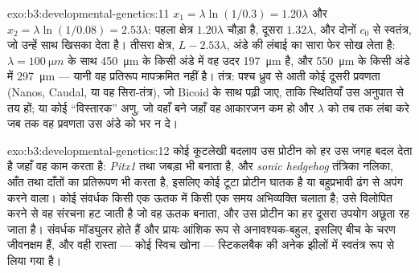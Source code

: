\begin{solution}{exo:b3:developmental-genetics:11}
$x_{1} = \lambda\ln(1/0.3) = 1.20\lambda$ और $x_{2} = \lambda\ln(1/0.08)
= 2.53\lambda$: पहला क्षेत्र $1.20\lambda$ चौड़ा है, दूसरा
$1.32\lambda$, और दोनों $c_{0}$ से स्वतंत्र, जो उन्हें साथ खिसका देता
है। तीसरा क्षेत्र, $L - 2.53\lambda$, अंडे की लंबाई का सारा फेर सोख
लेता है: $\lambda = \qty{100}{\micro m}$ के साथ \qty{450}{\micro m} के
किसी अंडे में वह उदर \qty{197}{\micro m} है, और \qty{550}{\micro m} के
किसी अंडे में \qty{297}{\micro m} --- यानी वह प्रतिरूप मापक्रमित नहीं
है। तंत्र: पश्च ध्रुव से आती कोई दूसरी प्रवणता (Nanos, Caudal, या वह
सिरा-तंत्र), जो Bicoid के साथ पढ़ी जाए, ताकि स्थितियाँ उस अनुपात से तय
हों; या कोई ``विस्तारक'' अणु, जो वहाँ बने जहाँ वह आकारजन कम हो और
$\lambda$ को तब तक लंबा करे जब तक वह प्रवणता उस अंडे को भर न दे।
\end{solution}

\begin{solution}{exo:b3:developmental-genetics:12}
कोई कूटलेखी बदलाव उस प्रोटीन को हर उस जगह बदल देता है जहाँ वह काम करता
है: \emph{Pitx1}  तथा जबड़ा भी बनाता है, और \emph{sonic hedgehog}
तंत्रिका नलिका, आँत तथा दाँतों का प्रतिरूपण भी करता है, इसलिए कोई टूटा
प्रोटीन घातक है या बहुप्रभावी ढंग से अपंग करने वाला। कोई संवर्धक किसी
एक ऊतक में किसी एक समय अभिव्यक्ति चलाता है; उसे विलोपित करने से वह
संरचना हट जाती है जो वह ऊतक बनाता, और उस प्रोटीन का हर दूसरा उपयोग अछूता
रह जाता है। संवर्धक मॉड्युलर होते हैं और प्रायः आंशिक रूप से
अनावश्यक-बहुल, इसलिए बीच के चरण जीवनक्षम हैं, और वही रास्ता --- कोई
स्विच खोना --- स्टिकलबैक की अनेक झीलों में स्वतंत्र रूप से लिया गया है।
\end{solution}

